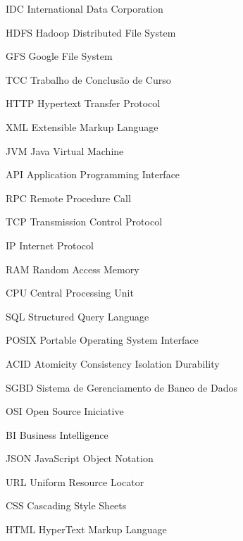 \begin{siglas}

  \item[IDC] International Data Corporation
  \item[HDFS] Hadoop Distributed File System
  \item[GFS] Google File System
  \item[TCC] Trabalho de Conclusão de Curso
  \item[HTTP] Hypertext Transfer Protocol
  \item[XML] Extensible Markup Language
  \item[JVM] Java Virtual Machine
  \item[API] Application Programming Interface
  \item[RPC] Remote Procedure Call
  \item[TCP] Transmission Control Protocol
  \item[IP] Internet Protocol
  \item[RAM] Random Access Memory
  \item[CPU] Central Processing Unit
  \item[SQL] Structured Query Language
  \item[POSIX] Portable Operating System Interface
  \item[ACID] Atomicity Consistency Isolation Durability
  \item[SGBD] Sistema de Gerenciamento de Banco de Dados
  \item[OSI] Open Source Iniciative
  \item[BI] Business Intelligence
  \item[JSON] JavaScript Object Notation
  \item[URL] Uniform Resource Locator
  \item[CSS] Cascading Style Sheets
  \item[HTML] HyperText Markup Language

\end{siglas}
